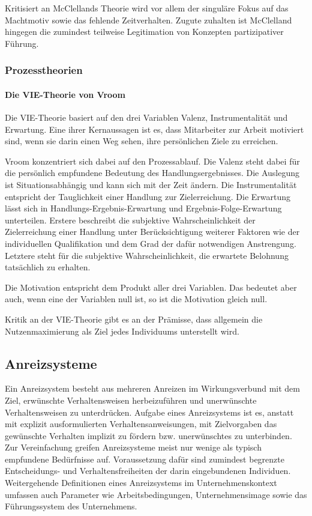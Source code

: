 Kritisiert an McClellands Theorie wird vor allem der singuläre Fokus auf das Machtmotiv sowie das fehlende Zeitverhalten. Zugute zuhalten ist McClelland hingegen die zumindest teilweise Legitimation von Konzepten partizipativer Führung. \citep[S. 398]{Drumm.2008}

\newpage
\subsubsection{Prozesstheorien}
\paragraph{Die VIE-Theorie von Vroom}
Die VIE-Theorie basiert auf den drei Variablen Valenz, Instrumentalität und Erwartung. Eine ihrer Kernaussagen ist es, dass Mitarbeiter zur Arbeit motiviert sind, wenn sie darin einen Weg sehen, ihre persönlichen Ziele zu erreichen. \citep[S. 30]{Nowka.2013}
 
Vroom konzentriert sich dabei auf den Prozessablauf. Die Valenz steht dabei für die \glqq […] persönlich empfundene Bedeutung des Handlungsergebnisses\grqq. \citep[S. 31]{Nowka.2013} Die Auslegung ist Situationsabhängig und kann sich mit der Zeit ändern. Die Instrumentalität entspricht der Tauglichkeit einer Handlung zur Zielerreichung. Die Erwartung lässt sich in Handlungs-Ergebnis-Erwartung und Ergebnis-Folge-Erwartung unterteilen.
Erstere beschreibt die subjektive Wahrscheinlichkeit der Zielerreichung einer Handlung unter Berücksichtigung weiterer Faktoren wie der individuellen Qualifikation und dem Grad der dafür notwendigen Anstrengung.
Letztere steht für die subjektive Wahrscheinlichkeit, die erwartete Belohnung tatsächlich zu erhalten. \citep[S. 31]{Nowka.2013}
 
Die Motivation entspricht dem Produkt aller drei Variablen. Das bedeutet aber auch, wenn eine der Variablen null ist, so ist die Motivation gleich null. \citep[S. 31]{Nowka.2013}
 
Kritik an der VIE-Theorie gibt es an der Prämisse, dass allgemein die Nutzenmaximierung als Ziel jedes Individuums unterstellt wird. \citep[S. 401]{Drumm.2008}

\subsection{Anreizsysteme}
Ein Anreizsystem besteht aus mehreren Anreizen im Wirkungsverbund mit dem Ziel, erwünschte Verhaltensweisen herbeizuführen und unerwünschte Verhaltensweisen zu unterdrücken. Aufgabe eines Anreizsystems ist es, anstatt mit explizit ausformulierten Verhaltensanweisungen, mit Zielvorgaben das gewünschte Verhalten implizit zu fördern bzw. unerwünschtes zu unterbinden. Zur Vereinfachung greifen Anreizsysteme meist nur wenige als typisch empfundene Bedürfnisse auf. Voraussetzung dafür sind zumindest begrenzte Entscheidungs- und Verhaltensfreiheiten der darin eingebundenen Individuen. Weitergehende Definitionen eines Anreizsystems im Unternehmenskontext umfassen auch Parameter wie Arbeitsbedingungen, Unternehmensimage sowie das Führungssystem des Unternehmens. \citep[S. 458]{Drumm.2008}

